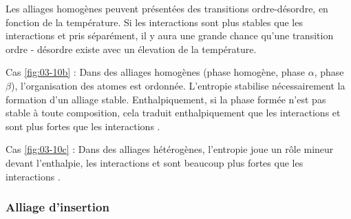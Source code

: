 \documentclass[a4paper]{book}
\begin{document}
Les alliages homogènes peuvent présentées des transitions ordre-désordre, en fonction de la température. Si les interactions  sont plus stables que les interactions  et  pris séparément, il y aura une grande chance qu'une transition ordre - désordre existe avec un élevation de la température.

Cas \ref{fig:03-10b} : Dans des alliages homogènes (phase homogène, phase $\alpha$, phase $\beta$), l'organisation des atomes est ordonnée. L'entropie stabilise nécessairement la formation d'un alliage stable. Enthalpiquement, si la phase formée n'est pas stable à toute composition, cela traduit enthalpiquement que les interactions  et  sont plus fortes que les interactions .

Cas \ref{fig:03-10c} : Dans des alliages hétérogènes, l'entropie joue un rôle mineur devant l'enthalpie, les interactions  et  sont beaucoup plus fortes que les interactions . 




\subsubsection{Alliage d'insertion}
\end{document}

